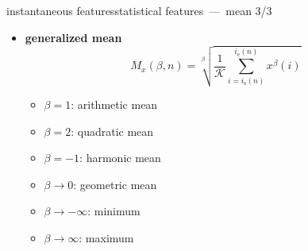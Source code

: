         \begin{frame}{instantaneous features}{statistical features~---~mean 3/3}
			\begin{itemize}
				\item	\textbf{generalized mean}
                    \begin{equation*}
                        M_x(\beta,n) = \sqrt[\beta]{\frac{1}{\mathcal{K}}\sum\limits_{i=i_{\mathrm{s}}(n)}^{i_{\mathrm{e}}(n)}{x^\beta(i)}} 
                    \end{equation*}
				\pause
                    \begin{footnotesize}
                    \begin{itemize}
                        \item	{$\beta=1$:} {arithmetic mean}
                        \item	{$\beta=2$:} {quadratic mean}
                        \item	{$\beta=-1$:} {harmonic mean}
                        \item	{$\beta\rightarrow 0$:} {geometric mean}
                        \item	{$\beta\rightarrow -\infty$:} {minimum}
                        \item	{$\beta\rightarrow \infty$:} {maximum}
                    \end{itemize}
                    \end{footnotesize}
			\end{itemize}
        \end{frame}
